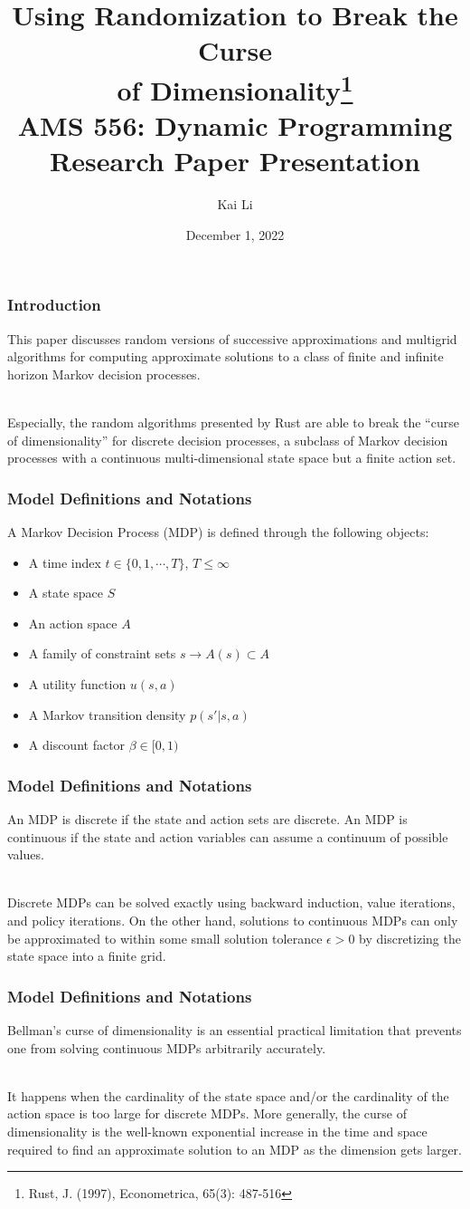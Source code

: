 \documentclass{beamer}
\date{December 1, 2022}
\title[Curse of Dimensionality]{Using Randomization to Break the Curse\\of Dimensionality\footnote[frame]{Rust, J. (1997), Econometrica, 65(3): 487-516}\\[1ex]\normalsize AMS 556: Dynamic Programming\\[1ex] Research Paper Presentation}
\author[Kai Li]{Kai Li}
\institute[AMS]{Applied Mathematics and Statistics, Stony Brook University}
\begin{document}
\frame{\titlepage}

\begin{frame}[fragile]
\frametitle{Introduction}

This paper discusses random versions of successive approximations and multigrid algorithms for computing approximate solutions to a class of finite and infinite horizon Markov decision processes.\\~\

Especially, the random algorithms presented by Rust are able to break the ``curse of dimensionality'' for discrete decision processes, a subclass of Markov decision processes with a continuous multi-dimensional state space but a finite action set.
\end{frame}

\begin{frame}[fragile]
\frametitle{Model Definitions and Notations}

A Markov Decision Process (MDP) is defined through the following objects:
\begin{itemize}
\item A time index $t\in\{0, 1, \cdots, T\}$, $T\leq\infty$
\item A state space $S$ 
\item An action space $A$
\item A family of constraint sets $s\to A(s)\subset A$
\item A utility function $u(s, a)$
\item A Markov transition density $p(s'|s, a)$
\item A discount factor $\beta\in[0, 1)$
\end{itemize}
\end{frame}

\begin{frame}[fragile]
\frametitle{Model Definitions and Notations}

An MDP is discrete if the state and action sets are discrete. An MDP is continuous if the state and action variables can assume a continuum of possible values. \\~\

Discrete MDPs can be solved exactly using backward induction, value iterations, and policy iterations. On the other hand, solutions to continuous MDPs can only be approximated to within some small solution tolerance $\epsilon>0$ by discretizing the state space into a finite grid.
\end{frame}

\begin{frame}[fragile]
\frametitle{Model Definitions and Notations}

Bellman's curse of dimensionality is an essential practical limitation that prevents one from solving continuous MDPs arbitrarily accurately. \\~\

It happens when the cardinality of the state space and/or the cardinality of the action space is too large for discrete MDPs. More generally, the curse of dimensionality is the well-known exponential increase in the time and space required to find an approximate solution to an MDP as the dimension gets larger.
\end{frame}
\end{document}
